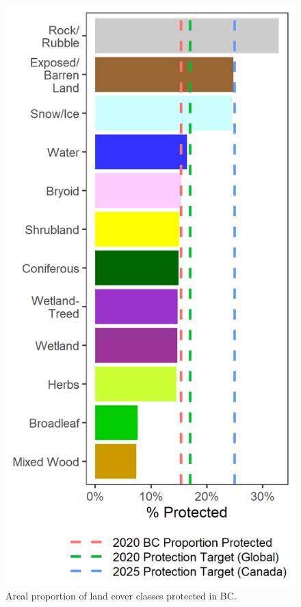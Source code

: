\documentclass[11pt]{article}
\makeatletter
\def\maxwidth{\ifdim\Gin@nat@width>\linewidth\linewidth
\else\Gin@nat@width\fi}
\let\Oldincludegraphics\includegraphics
\renewcommand{\includegraphics}[1]{\Oldincludegraphics[width=\maxwidth]{#1}}
\makeatother
\begin{document}
\begin{figure}
\hypertarget{fig:vlce-conch}{%
\centering
\includegraphics{figures/vlce_bar.png}
\caption{Areal proportion of land cover classes protected in
BC.}\label{fig:vlce-conch}
}
\end{figure}
\end{document}
